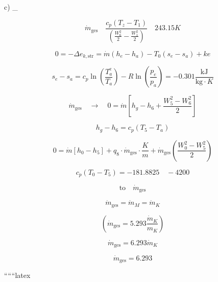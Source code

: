 c) \quad {}_{}

\[
\dot{m}_{\text{ges}} \quad \frac{c_p (T_{z} - T_{1})}{\left( \frac{W_{6}^{2}}{2} - \frac{W_{1}^{2}}{2} \right)} \quad 243.15K
\]

\[
0 = -\Delta e_{k,\text{str}} = \dot{m} (h_{e} - h_{a}) - T_{0} (s_{e} - s_{a}) + ke
\]

\[
s_{e} - s_{a} = c_p \ln \left( \frac{T_{a}^{e}}{T_{a}} \right) - R \ln \left( \frac{p_{e}}{p_{a}} \right) = -0.301 \frac{\text{kJ}}{\text{kg} \cdot K}
\]

\[
\dot{m}_{\text{ges}} \quad \rightarrow \quad 0 = \dot{m} \left[ h_{g} - h_{6} + \frac{W_{5}^{2} - W_{6}^{2}}{2} \right]
\]

\[
h_{g} - h_{6} = c_p (T_{5} - T_{a})
\]

\[
0 = \dot{m} \left[ h_{0} - h_{5} \right] + q_{8} \cdot \dot{m}_{\text{ges}} \cdot \frac{K}{m} + \dot{m}_{\text{ges}} \left( \frac{W_{0}^{2} - W_{5}^{2}}{2} \right)
\]

\[
c_p (T_{0} - T_{5}) = -181.8825 \quad -4200
\]

\[
\text{to} \quad \dot{m}_{\text{ges}}
\]

\[
\dot{m}_{\text{ges}} = \dot{m}_{M} = \dot{m}_{K}
\]

\[
(\dot{m}_{\text{ges}} = 5.293 \frac{\dot{m}_{K}}{m_{K}})
\]

\[
\dot{m}_{\text{ges}} = 6.293 \dot{m}_{K}
\]

\[
\dot{m}_{\text{ges}} = 6.293
\]

``````latex